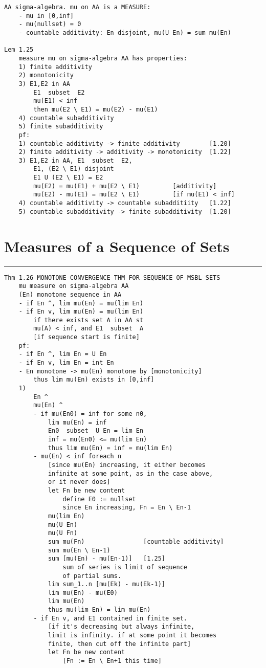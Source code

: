 \documentclass{article}
\begin{document}
\begin{flushleft}
\begin{verbatim}
AA sigma-algebra. mu on AA is a MEASURE:
    - mu in [0,inf]
    - mu(nullset) = 0
    - countable additivity: En disjoint, mu(U En) = sum mu(En)

Lem 1.25 
    measure mu on sigma-algebra AA has properties:
    1) finite additivity 
    2) monotonicity
    3) E1,E2 in AA
        E1  subset  E2 
        mu(E1) < inf
        then mu(E2 \ E1) = mu(E2) - mu(E1)
    4) countable subadditivity 
    5) finite subadditivity
    pf:
    1) countable additivity -> finite additivity        [1.20]
    2) finite additivity -> additivity -> monotonicity  [1.22]
    3) E1,E2 in AA, E1  subset  E2, 
        E1, (E2 \ E1) disjoint 
        E1 U (E2 \ E1) = E2 
        mu(E2) = mu(E1) + mu(E2 \ E1)         [additivity]
        mu(E2) - mu(E1) = mu(E2 \ E1)         [if mu(E1) < inf]
    4) countable additivity -> countable subadditiity   [1.22]
    5) countable subadditivity -> finite subadditivity  [1.20]
\end{verbatim}

\section*{Measures of a Sequence of Sets}
\bigbreak
\hrule
\bigbreak

\begin{verbatim}
Thm 1.26 MONOTONE CONVERGENCE THM FOR SEQUENCE OF MSBL SETS
    mu measure on sigma-algebra AA 
    (En) monotone sequence in AA
    - if En ^, lim mu(En) = mu(lim En)
    - if En v, lim mu(En) = mu(lim En) 
        if there exists set A in AA st 
        mu(A) < inf, and E1  subset  A 
        [if sequence start is finite]
    pf:
    - if En ^, lim En = U En 
    - if En v, lim En = int En
    - En monotone -> mu(En) monotone by [monotonicity]    
        thus lim mu(En) exists in [0,inf]
    1)
        En ^ 
        mu(En) ^ 
        - if mu(En0) = inf for some n0,
            lim mu(En) = inf 
            En0  subset  U En = lim En 
            inf = mu(En0) <= mu(lim En)
            thus lim mu(En) = inf = mu(lim En) 
        - mu(En) < inf foreach n 
            [since mu(En) increasing, it either becomes 
            infinite at some point, as in the case above, 
            or it never does]
            let Fn be new content 
                define E0 := nullset
                since En increasing, Fn = En \ En-1
            mu(lim En)
            mu(U En)
            mu(U Fn)
            sum mu(Fn)                [countable additivity]
            sum mu(En \ En-1)
            sum [mu(En) - mu(En-1)]   [1.25]
                sum of series is limit of sequence 
                of partial sums.
            lim sum_1..n [mu(Ek) - mu(Ek-1)]
            lim mu(En) - mu(E0)
            lim mu(En)
            thus mu(lim En) = lim mu(En)
        - if En v, and E1 contained in finite set.
            [if it's decreasing but always infinite, 
            limit is infinity. if at some point it becomes
            finite, then cut off the infinite part]
            let Fn be new content 
                [Fn := En \ En+1 this time]
            

\end{verbatim}
\end{flushleft}
\end{document}
